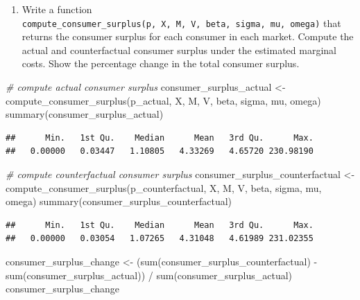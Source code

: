 \documentclass[
]{book}
\newenvironment{Shaded}{\begin{snugshade}}{\end{snugshade}}
\newcommand{\CommentTok}[1]{\textcolor[rgb]{0.56,0.35,0.01}{\textit{#1}}}
\newcommand{\FunctionTok}[1]{\textcolor[rgb]{0.00,0.00,0.00}{#1}}
\newcommand{\NormalTok}[1]{#1}
\newcommand{\OtherTok}[1]{\textcolor[rgb]{0.56,0.35,0.01}{#1}}
\newcommand{\SpecialCharTok}[1]{\textcolor[rgb]{0.00,0.00,0.00}{#1}}
\providecommand{\tightlist}{%
  \setlength{\itemsep}{0pt}\setlength{\parskip}{0pt}}
\begin{document}
\begin{enumerate}
\def\labelenumi{\arabic{enumi}.}
\setcounter{enumi}{3}
\tightlist
\item
  Write a function \texttt{compute\_consumer\_surplus(p,\ X,\ M,\ V,\ beta,\ sigma,\ mu,\ omega)} that returns the consumer surplus for each consumer in each market. Compute the actual and counterfactual consumer surplus under the estimated marginal costs. Show the percentage change in the total consumer surplus.
\end{enumerate}

\begin{Shaded}
\begin{Highlighting}[]
\CommentTok{\# compute actual consumer surplus}
\NormalTok{consumer\_surplus\_actual }\OtherTok{\textless{}{-}} 
  \FunctionTok{compute\_consumer\_surplus}\NormalTok{(p\_actual, X, M, V, beta, sigma, mu, omega)}
\FunctionTok{summary}\NormalTok{(consumer\_surplus\_actual)}
\end{Highlighting}
\end{Shaded}

\begin{verbatim}
##      Min.   1st Qu.    Median      Mean   3rd Qu.      Max. 
##   0.00000   0.03447   1.10805   4.33269   4.65720 230.98190
\end{verbatim}

\begin{Shaded}
\begin{Highlighting}[]
\CommentTok{\# compute counterfactual consumer surplus}
\NormalTok{consumer\_surplus\_counterfactual }\OtherTok{\textless{}{-}} 
  \FunctionTok{compute\_consumer\_surplus}\NormalTok{(p\_counterfactual, X, M, V, beta, sigma, mu, omega)}
\FunctionTok{summary}\NormalTok{(consumer\_surplus\_counterfactual)}
\end{Highlighting}
\end{Shaded}

\begin{verbatim}
##      Min.   1st Qu.    Median      Mean   3rd Qu.      Max. 
##   0.00000   0.03054   1.07265   4.31048   4.61989 231.02355
\end{verbatim}

\begin{Shaded}
\begin{Highlighting}[]
\NormalTok{consumer\_surplus\_change }\OtherTok{\textless{}{-}} 
\NormalTok{  (}\FunctionTok{sum}\NormalTok{(consumer\_surplus\_counterfactual) }\SpecialCharTok{{-}} 
     \FunctionTok{sum}\NormalTok{(consumer\_surplus\_actual)) }\SpecialCharTok{/}
  \FunctionTok{sum}\NormalTok{(consumer\_surplus\_actual)}
\NormalTok{consumer\_surplus\_change}
\end{Highlighting}
\end{Shaded}
\end{document}
